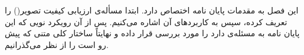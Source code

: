 این فصل به مقدمات پایان نامه اختصاص دارد. ابتدا مسأله‌ی ارزیابی کیفیت تصویر() را تعریف کرده، سپس به کاربردهای آن اشاره می‌کنیم. پس از آن رویکرد نویی که این پایان نامه به مسئله‌ی  دارد را مورد بررسی قرار داده و نهایتاً ساختار کلی متنی که پیش رو است را از نظر می‌گذرانیم.

\begin{comment}
\begin{figure}[ht]
  \centering
  \texttt{[image: harmonized.pdf]}
  \شرح{شرح \rl{harmonized.pdf} \مرجع{someCitation}}
  \label{شکل:دسته‌های‌IQA}
\end{figure}
\end{comment}

